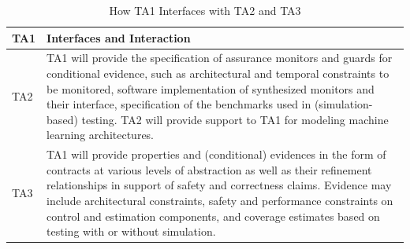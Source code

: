 \begin{table}[h!]
\caption{How TA1 Interfaces with TA2 and TA3}
  \centering
  {\footnotesize
\begin{tabular}{|m{.5in}|m{5.65in}|} 
\hline
\textbf{TA1} & \textbf{Interfaces and Interaction} 
\\\hline
TA2 & 
TA1 will provide the specification of assurance monitors and guards for conditional evidence, such as  architectural and temporal constraints to be monitored, software implementation of synthesized monitors and their interface, specification of the benchmarks used in (simulation-based) testing. TA2 will provide support to TA1 for modeling machine learning architectures.\\
\hline
TA3 & 
TA1 will provide properties and (conditional) evidences in the form of contracts at various levels of abstraction  as well as their refinement relationships in support of safety and correctness claims. Evidence may include architectural constraints, safety and performance  constraints on control and estimation components, and  coverage estimates based on testing with or without simulation.  
\\\cline{1-2}

\hline
\end{tabular}
}
\end{table}

